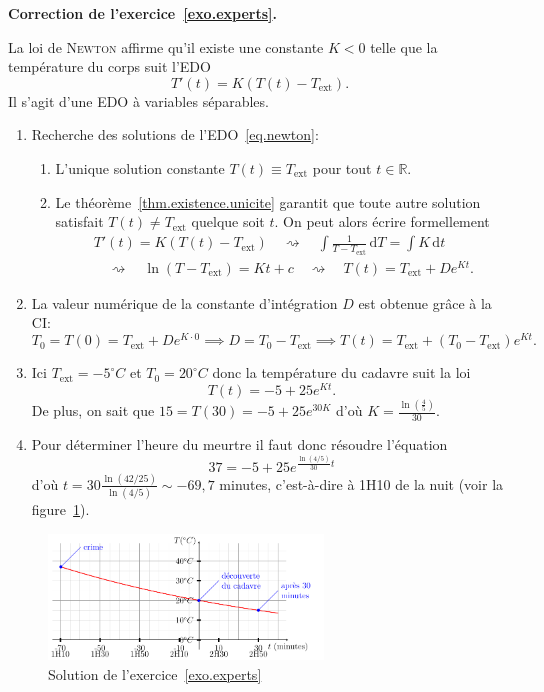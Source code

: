 \documentclass[a4paper,10pt]{scrartcl}
\theoremstyle{definition}
\theoremstyle{remark}
\theoremstyle{plain}
\newenvironment{sol}[1]{\noindent\textbf{Correction de l'exercice~\ref{#1}.}\par}{}
\newcommand{\celsius}{^\circ C}
\newcommand{\ensemble}[1]{\mathbb{#1}}
\newcommand{\R}{\ensemble{R}}
\newcommand{\differential}[1]{\,\mathrm{d}#1}
\newcommand{\dt}{\differential{t}}
\newcommand{\dT}{\differential{T}}
\begin{document}
\begin{sol}{exo.experts}
La loi de \textsc{Newton} affirme qu'il existe une constante $K<0$ telle que la température du corps suit l'EDO
\begin{equation}\label{eq.newton}
T'(t)=K(T(t)-T_\text{ext}).
\end{equation}
Il s'agit d'une EDO à variables séparables.

\begin{enumerate}

\item Recherche des solutions de l'EDO~\eqref{eq.newton}:
	\begin{enumerate}
	\item L'unique solution constante $T(t)\equiv T_\text{ext}$ pour tout $t\in\R$.
	\item Le théorème~\ref{thm.existence.unicite} garantit que toute autre solution satisfait $T(t)\neq T_\text{ext}$ quelque soit $t$. On peut alors écrire formellement
	\begin{multline*}
	T'(t)=K(T(t)-T_\text{ext})
	\quad\rightsquigarrow\quad
	\int\frac{1}{T-T_\text{ext}}\dT=\int K\dt
	\\
	\quad\rightsquigarrow\quad
	\ln(T-T_\text{ext})=Kt+c
	\quad\rightsquigarrow\quad
	T(t)=T_\text{ext}+De^{Kt}.
	\end{multline*}
	\end{enumerate}

\item La valeur numérique de la constante d'intégration $D$ est obtenue grâce à la CI:
	\[
	T_0=T(0)=T_\text{ext}+De^{K\cdot0}
	\implies
	D=T_0-T_\text{ext}
	\implies
	T(t)=T_\text{ext}+(T_0-T_\text{ext})e^{Kt}.
	\]

\item Ici $T_\text{ext}=-5\celsius$ et $T_0=20\celsius$ donc la température du cadavre suit la loi
	\[
	T(t)=-5+25e^{Kt}.
	\]
	De plus, on sait que $15=T(30)=-5+25e^{30K}$ d'où $K=\frac{\ln\left(\frac{4}{5}\right)}{30}$. 

\item Pour déterminer l'heure du meurtre il faut donc résoudre l'équation
	\[
	37=-5+25e^{\frac{\ln(4/5)}{30}t}
	\]
	d'où $t=30\frac{\ln(42/25)}{\ln(4/5)}\sim-69{,}7$ minutes, c'est-à-dire à 1H10 de la nuit (voir la figure~\ref{fig.solution}).
\end{enumerate}

\begin{figure}
\centering
\includegraphics[width=0.65\textwidth]{solution}
\caption{Solution de l'exercice~\ref{exo.experts}}
\label{fig.solution}
\end{figure}
\end{sol}
\end{document}
